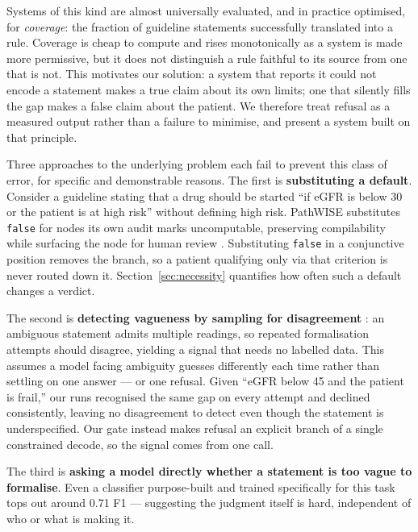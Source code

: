 \documentclass{article}
\begin{document}
Systems of this kind are almost universally evaluated, and in practice optimised, for \emph{coverage}: the fraction of guideline statements successfully translated into a rule. Coverage is cheap to compute and rises monotonically as a system is made more permissive, but it does not distinguish a rule faithful to its source from one that is not. This motivates our solution: a system that reports it could not encode a statement makes a true claim about its own limits; one that silently fills the gap makes a false claim about the patient. We therefore treat refusal as a measured output rather than a failure to minimise, and present a system built on that principle.

Three approaches to the underlying problem each fail to prevent this class of error, for specific and demonstrable reasons. The first is \textbf{substituting a default}. Consider a guideline stating that a drug should be started ``if eGFR is below 30 or the patient is at high risk'' without defining high risk. PathWISE substitutes \texttt{false} for nodes its own audit marks uncomputable, preserving compilability while surfacing the node for human review \citep{pathwise}. Substituting \texttt{false} in a conjunctive position removes the branch, so a patient qualifying only via that criterion is never routed down it. Section~\ref{sec:necessity} quantifies how often such a default changes a verdict.

The second is \textbf{detecting vagueness by sampling for disagreement} \citep{ksample}: an ambiguous statement admits multiple readings, so repeated formalisation attempts should disagree, yielding a signal that needs no labelled data. This assumes a model facing ambiguity guesses differently each time rather than settling on one answer --- or one refusal. Given ``eGFR below 45 and the patient is frail,'' our runs recognised the same gap on every attempt and declined consistently, leaving no disagreement to detect even though the statement is underspecified. Our gate instead makes refusal an explicit branch of a single constrained decode, so the signal comes from one call.

The third is \textbf{asking a model directly whether a statement is too vague to formalise}. Even a classifier purpose-built and trained specifically for this task tops out around 0.71 F1 \citep{errorcat} --- suggesting the judgment itself is hard, independent of who or what is making it.
\end{document}
